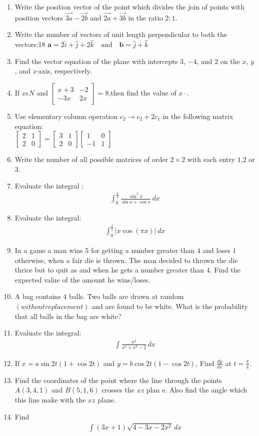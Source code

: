 \documentclass[12pt,-letter paper]{article}
\let\vec\mathbf{}
\let\vec\mathbf{}
\let\vec\mathbf{}
\providecommand{\myvec}[1]{\ensuremath{\begin{bmatrix}#1\end{bmatrix}}}
\providecommand{\brak}[1]{\ensuremath{\left(#1\right)}}
\begin{document}
\begin{enumerate}
\item Write the position vector of the point which divides the join of points with position vectors $ \overrightarrow{3a} -\overrightarrow{2b} $ and $ \overrightarrow{2a}+\overrightarrow{3b} $ in the ratio $ 2:1 $.
\item Write the number of vectors of unit length perpendicular to both the vectors:18 $ 
\vec{a} = 2\hat{i} + \hat{j} + 2\hat{k} \quad \text{and} \quad \vec{b} = \hat{j} + \hat{k}$
\item Find the vector equation of the plane with intercepts $3$, $-4$, and $2$ on the $x$, $y$, and $z$-axis, respectively.
\item If $x$$\epsilon N$ and $\myvec{x+3 & -2\\ -3x & 2x}=8$,then find the value of $x\cdot$.
\item Use elementary column operation $c_2 \rightarrow c_{2}+2c_{1}$ in the following  matrix  equation:\\ $\myvec{2 & 1 \\     2 & 0}=\myvec{3 & 1 \\ 2 & 0}\myvec{1 & 0 \\ -1 & 1}$
\item  Write the number of all possible matrices of order \(2\times 2\) with each entry $1$,$2$ or $3$.
\item Evaluate the integral : 
\begin{align*} 
\int_{0}^{\frac{\pi}{2}} \frac{\sin^2 x}{\sin x + \cos x} \, dx
\end{align*}
\item Evaluate the integral:
\begin{align*}
\int_{0}^\frac{3}{2}\left| x \cos(\pi x) \right| \, dx
\end{align*}
\item In a game a man wins  \rupee  $5$  for getting a number greater than $4$ and loses  \rupee $1$ otherwise, when a fair     die is thrown. The man decided to thrown the die thrice but to quit as and when he gets a number greater than $4$. Find the     expected value of the amount he wins/loses.
\item  A bag contains $4$ balls. Two balls are drawn at random $\brak{without replacement}$ and are found to be white. What     is the probability that all balls in the bag are white?
\item Evaluate the integral:                            \begin{align*}                                    
\int \frac{x^2}{x^4 + x^2 - 2} \, dx   
\end{align*}
\item If $x= a \sin 2t (1 + \cos 2t)$ and $y= b \cos 2t (1 - \cos 2t)$, Find $\frac{dy}{dx}$ at $ t = \frac{\pi}{4}$.
\item Find the coordinates of the point where the line through the points $ A(3,4,1) $ and $B(5,1,6)$ crosses the $xz$ plan    e. Also find the angle which this line make with the $xz$ plane.
\item Find \begin{align*}  
\int (3x+1)\sqrt {4-3x-2x^2} \, dx    
\end{align*}


\end{enumerate}
\end{document}
